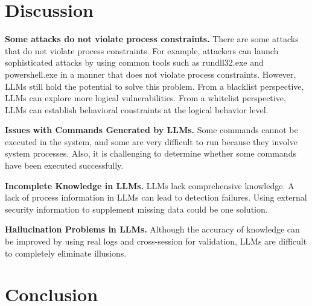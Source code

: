 
\section{Discussion}

\noindent
{\bf Some attacks do not violate process constraints.}
There are some attacks that do not violate process constraints. For example, attackers can launch sophisticated attacks by using common tools such as rundll32.exe and powershell.exe in a manner that does not violate process constraints. However, LLMs still hold the potential to solve this problem. From a blacklist perspective, LLMs can explore more logical vulnerabilities. From a whitelist perspective, LLMs can establish behavioral constraints at the logical behavior level.

\noindent
{\bf Issues with Commands Generated by LLMs.}
Some commands cannot be executed in the system, and some are very difficult to run because they involve system processes. Also, it is challenging to determine whether some commands have been executed successfully.

\noindent
{\bf Incomplete Knowledge in LLMs.}
LLMs lack comprehensive knowledge. A lack of process information in LLMs can lead to detection failures. Using external security information to supplement missing data could be one solution.

\noindent
{\bf Hallucination Problems in LLMs.}
Although the accuracy of knowledge can be improved by using real logs and cross-session for validation, LLMs are difficult to completely eliminate illusions.


\section{Conclusion}